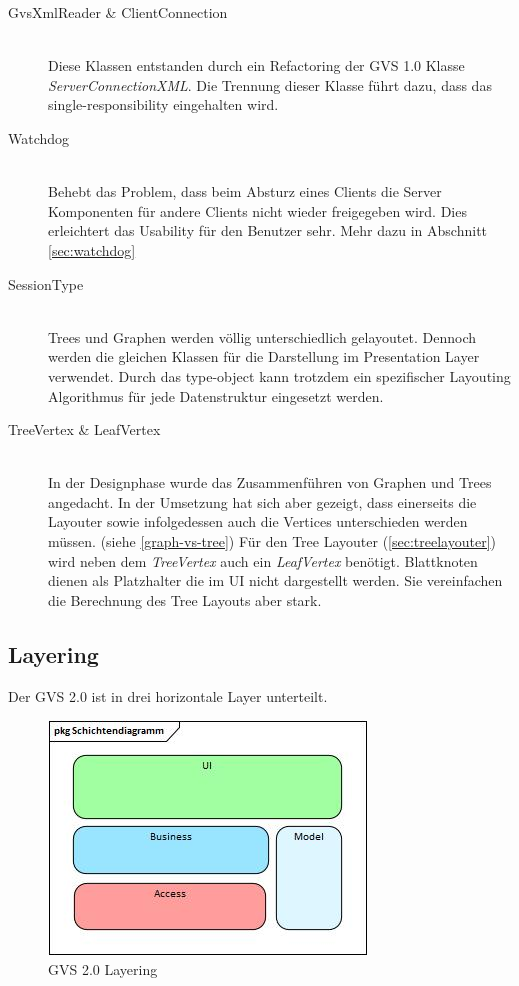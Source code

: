 \documentclass[11pt,a4paper,english,oneside]{book}
\numberwithin{equation}{chapter}
\begin{document}
	\begin{description} \label{desc:architecture-changes}
		\item[GvsXmlReader \& ClientConnection ] \hfill \\ Diese Klassen entstanden durch ein Refactoring der GVS 1.0 Klasse \textit{ServerConnectionXML}. Die Trennung dieser Klasse führt dazu, dass das \gls{single-responsibility} eingehalten wird. 
		\item[Watchdog] \hfill \\ Behebt das Problem, dass beim Absturz eines Clients die Server Komponenten für andere Clients nicht wieder freigegeben wird. Dies erleichtert das Usability für den Benutzer sehr. Mehr dazu in Abschnitt \ref{sec:watchdog}
		\item[SessionType] \hfill \\ Trees und Graphen werden völlig unterschiedlich gelayoutet. Dennoch werden die gleichen Klassen für die Darstellung im Presentation Layer verwendet. Durch das \gls{type-object} kann trotzdem ein spezifischer Layouting Algorithmus für jede Datenstruktur eingesetzt werden.
		\item[TreeVertex \& LeafVertex] \hfill \\ 
		In der Designphase wurde das Zusammenführen von Graphen und Trees angedacht. In der Umsetzung hat sich aber gezeigt, dass einerseits die Layouter sowie infolgedessen auch die Vertices unterschieden werden müssen. (siehe \ref{graph-vs-tree}) Für den Tree Layouter (\ref{sec:treelayouter}) wird neben dem \textit{TreeVertex} auch ein \textit{LeafVertex} benötigt.  Blattknoten dienen als Platzhalter die im UI nicht dargestellt werden. Sie vereinfachen die Berechnung des Tree Layouts aber stark.
	\end{description}

	\subsection{Layering} \label{ssec:layering}
	Der GVS 2.0 ist in drei horizontale Layer unterteilt.
	
	\begin{figure}[h!]
		\centering
		\includegraphics[width=0.5\linewidth]{assets/images/layering}
		\caption{GVS 2.0 Layering}
		\label{fig:layering}
	\end{figure}
	
\end{document}

